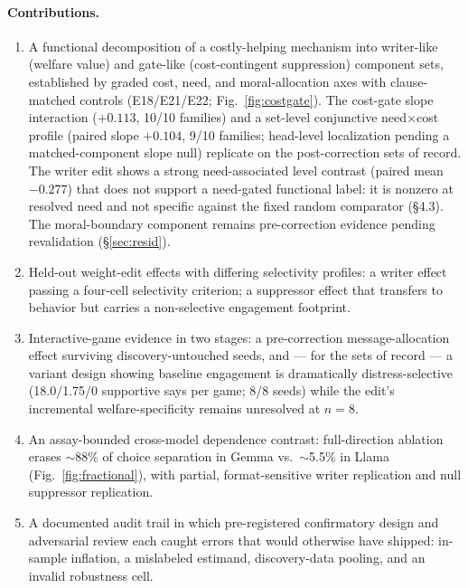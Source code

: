 \documentclass{article}
\begin{document}
\paragraph{Contributions.}
\begin{enumerate}
  \item A functional decomposition of a costly-helping mechanism into
        writer-like (welfare value) and gate-like (cost-contingent
        suppression) component sets, established by graded cost, need, and
        moral-allocation axes with clause-matched controls
        (E18/E21/E22; Fig.~\ref{fig:costgate}). The cost-gate slope
        interaction ($+0.113$, 10/10 families) and a set-level conjunctive
        need$\times$cost profile (paired slope $+0.104$, 9/10 families;
        head-level localization pending a matched-component slope null)
        replicate on the post-correction sets of record. The writer edit
        shows a strong need-associated level contrast (paired mean $-0.277$)
        that does not support a need-gated functional label: it is nonzero
        at resolved need and not specific against the fixed random
        comparator (\S4.3). The moral-boundary component remains
        pre-correction evidence pending revalidation (\S\ref{sec:resid}).
  \item Held-out weight-edit effects with differing selectivity profiles:
        a writer effect passing a four-cell selectivity criterion; a
        suppressor effect that transfers to behavior but carries a
        non-selective engagement footprint.
  \item Interactive-game evidence in two stages: a pre-correction
        message-allocation effect surviving discovery-untouched seeds, and —
        for the sets of record — a variant design showing baseline engagement
        is dramatically distress-selective (18.0/1.75/0 supportive says per
        game; 8/8 seeds) while the edit's incremental welfare-specificity
        remains unresolved at $n{=}8$.
  \item An assay-bounded cross-model dependence contrast: full-direction
        ablation erases $\sim$88\% of choice separation in Gemma vs.\
        $\sim$5.5\% in Llama (Fig.~\ref{fig:fractional}), with partial,
        format-sensitive writer replication and null suppressor replication.
  \item A documented audit trail in which pre-registered confirmatory design
        and adversarial review each caught errors that would otherwise have
        shipped: in-sample inflation, a mislabeled estimand, discovery-data
        pooling, and an invalid robustness cell.
\end{enumerate}
\end{document}
